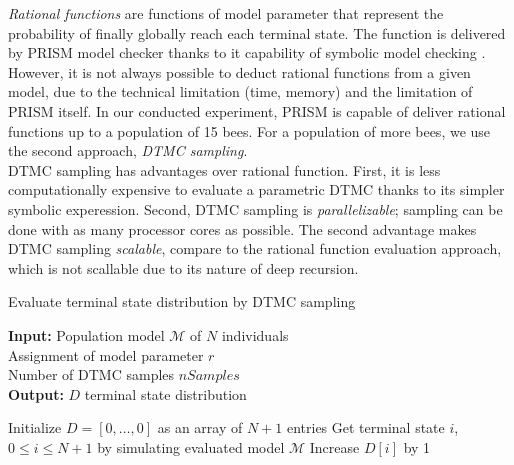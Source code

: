 \documentclass[12pt]{article}
\theoremstyle{definition}
\begin{document}
\textit{Rational functions} are functions of model parameter that represent the
probability of finally globally reach each terminal state. The function is
delivered by PRISM model checker thanks to it capability of symbolic model
checking \cite{KNP11}.\\
However, it is not always possible to deduct rational functions from a given
model, due to the technical limitation (time, memory) and the limitation of
PRISM itself. In our conducted experiment, PRISM is capable of deliver rational
functions up to a population of 15 bees. For a population of more bees, we use
the second approach, \textit{DTMC sampling}.\\
DTMC sampling has advantages over rational function. First, it is less
computationally expensive to evaluate a parametric DTMC thanks to its simpler
symbolic experession. Second, DTMC sampling is \textit{parallelizable}; sampling
can be done with as many processor cores as possible. The second advantage makes
DTMC sampling \textit{scalable}, compare to the rational function evaluation
approach, which is not scallable due to its nature of deep recursion.
\begin{algorithm}[H]
  \caption{Evaluate terminal state distribution by DTMC sampling}
  \hspace*{\algorithmicindent} \textbf{Input:} Population model $\mathcal{M}$ of
    $N$ individuals\\ Assignment of model parameter $r$\\ Number of DTMC samples $nSamples$\\
  \hspace*{\algorithmicindent} \textbf{Output:} $D$ terminal state distribution
  \begin{algorithmic}[1]
    \State Initialize $D=[0,\ldots,0]$ as an array of $N+1$ entries
    \State Get terminal state $i$, $0\leq i \leq N+1$ by simulating evaluated
    model $\mathcal{M}$
    \State Increase $D[i]$ by 1
    \EndWhile
    \EndProcedure
  \end{algorithmic}
\end{algorithm}
\end{document}
